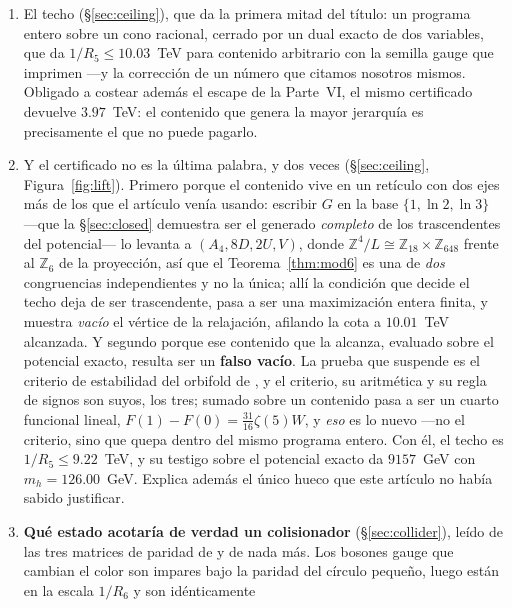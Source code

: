 \documentclass[11pt,a4paper]{article}
\newcommand{\ZZ}{\mathbb{Z}}
\begin{document}
\begin{enumerate}
semilla, y esa misma fórmula es la razón de que la obstrucción muera allí en el cuarto momento: la
mitad antiperiódica entra con $2-2^{p}$, que se anula en $p=1$, dejando decidir al peso periódico
solo ---y con la semilla candidata esa misma anulación convierte al cuarto momento en el único
peldaño \emph{impar} de los tres.
\item El techo (\S\ref{sec:ceiling}), que da la primera mitad del título: un programa entero sobre un cono
racional, cerrado por un dual exacto de dos variables, que da $1/R_5\le 10.03$~TeV para contenido
arbitrario con la semilla gauge que \cite{KM25} imprimen ---y la corrección de un número que
citamos nosotros mismos. Obligado a costear además
el escape de la Parte~VI, el mismo certificado devuelve $3.97$~TeV: el contenido que genera la
mayor jerarquía es precisamente el que no puede pagarlo.
\item Y el certificado no es la última palabra, y dos veces (\S\ref{sec:ceiling},
Figura~\ref{fig:lift}). Primero porque el contenido vive en un retículo con dos ejes más de los que el
artículo venía usando: escribir $G$ en la base $\{1,\ln2,\ln3\}$ ---que la \S\ref{sec:closed}
demuestra ser el generado \emph{completo} de los trascendentes del potencial--- lo levanta a
$(A_4,8D,2U,V)$, donde $\ZZ^4/L\cong\ZZ_{18}\times\ZZ_{648}$ frente al $\ZZ_6$ de la proyección,
así que el Teorema~\ref{thm:mod6} es una de \emph{dos} congruencias independientes y no la única;
allí la condición que decide el techo
deja de ser trascendente, pasa a ser una maximización entera finita, y muestra \emph{vacío} el
vértice de la relajación, afilando la cota a $10.01$~TeV alcanzada. Y segundo porque ese contenido
que la alcanza, evaluado sobre el potencial exacto, resulta ser un \textbf{falso vacío}. La prueba
que suspende es el criterio de estabilidad del orbifold de \cite{CCD24}, y el criterio, su
aritmética y su regla de signos son suyos, los tres; sumado sobre un contenido pasa a ser un cuarto
funcional lineal, $F(1)-F(0)=\tfrac{31}{16}\zeta(5)W$, y \emph{eso} es lo nuevo ---no el criterio,
sino que quepa dentro del mismo programa entero. Con él, el techo es $1/R_5\le9.22$~TeV, y su
testigo sobre el potencial exacto da $9157$~GeV con $m_h=126.00$~GeV. Explica además el único hueco
que este artículo no había sabido justificar.
\item \textbf{Qué estado acotaría de verdad un colisionador} (\S\ref{sec:collider}), leído de las
tres matrices de paridad de \cite{KM25} y de nada más. Los bosones gauge que cambian el color son
impares bajo la paridad del círculo pequeño, luego están en la escala $1/R_6$ y son idénticamente

\end{enumerate}
\end{document}
